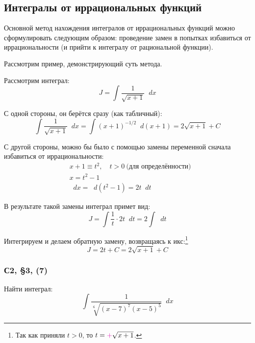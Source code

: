 \documentclass[a4paper,12pt]{article}
\newcommand{\diff}{\mathop{}\!d}
\begin{document}
  \subsection{Интегралы от иррациональных функций}

  Основной метод нахождения интегралов от иррациональных функций можно сформулировать следующим образом: проведение замен в попытках избавиться от иррациональности (и прийти к интегралу от рациональной функции).

  Рассмотрим пример, демонстрирующий суть метода.

  \begin{example}
      Рассмотрим интеграл:
      \[
        J = \int \frac{1}{\sqrt{x + 1}} \diff x
      \]

      С одной стороны, он берётся сразу (как табличный):
      \[
        \int \frac{1}{\sqrt{x + 1}} \diff x = \int (x + 1)^{-1/2} \diff (x + 1) = 2 \sqrt{x + 1} + C
      \]

      С другой стороны, можно бы было с помощью замены переменной сначала избавиться от иррациональности:
      \[
        \begin{aligned}
          &x + 1 \equiv t^2,\quad t > 0 \ \mbox{(для определённости)}\\
          &x = t^2 - 1\\
          &\diff x = \diff(t^2 - 1) = 2 t \diff t
        \end{aligned}
      \]

      В результате такой замены интеграл примет вид:
      \[
        J = \int \frac{1}{t} \cdot 2t \diff t = 2 \int \diff t
      \]

      Интегрируем и делаем обратную замену, возвращаясь к икс:\footnote{
        Так как приняли $t > 0$, то $t \hm= \textcolor{pink}{+}\sqrt{x + 1}$.
      }
      \[
        J = 2t + C = 2\sqrt{x + 1} + C
      \]
  \end{example}

  \subsubsection{С2, \S 3, (7)}

  Найти интеграл:
  \begin{equation}\label{eq:3-2(7)-int}
    \int \frac{1}{\sqrt[6]{
      (x - 7)^7 (x - 5)^5
    }} \diff x
  \end{equation}
  
\end{document}
